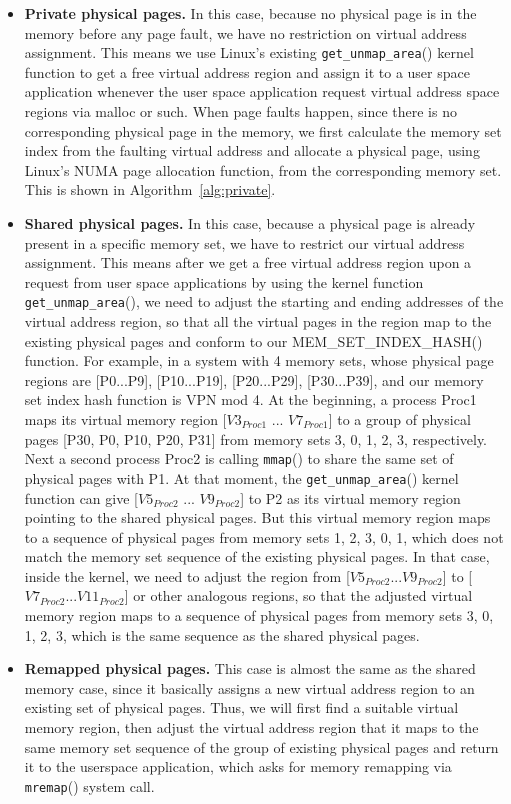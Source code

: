 \begin{itemize}
  \item \textbf{Private physical pages.} In this case, because no physical page is in the memory
  before any page fault, we have no restriction on virtual address assignment. 
  This means we use Linux’s existing \verb|get_unmap_area|() kernel function to 
  get a free virtual address region and assign it to a user space application whenever
  the user space application request virtual address space regions via malloc or such.
  When page faults happen, since there is no corresponding physical page in the memory, 
  we first calculate the memory set index from the faulting virtual address and allocate 
  a physical page, using Linux's NUMA page allocation function, from the corresponding 
  memory set. This is shown in Algorithm~\ref{alg:private}.
  
  \item \textbf{Shared physical pages.} In this case, because a physical page is already 
  present in a specific memory set, we have to restrict our virtual address assignment. 
  This means after we get a free virtual address region upon a request from user space applications
  by using the kernel function \verb|get_unmap_area|(), we need to adjust the starting
  and ending addresses of the virtual address region, so that all the virtual pages 
  in the region map to the existing physical pages and conform to our MEM\_SET\_INDEX\_HASH()
  function. For example, in a system with 4 memory sets, whose physical page regions are [P0...P9], 
  [P10...P19], [P20...P29], [P30...P39], and our memory set index hash function is VPN mod 4.
  At the beginning, a process Proc1 maps its virtual memory region [$V3_{Proc1}$ ... $V7_{Proc1}$] to a group of 
  physical pages [P30, P0, P10, P20, P31] from memory sets 3, 0, 1, 2, 3, respectively. 
  Next a second process Proc2 is calling \verb|mmap|() to 
  share the same set of physical pages with P1. At that moment, the \verb|get_unmap_area|() 
  kernel function can give [$V5_{Proc2}$ ... $V9_{Proc2}$] to P2 as its virtual memory region pointing to the
  shared physical pages. But this virtual memory region maps to a sequence of physical pages from memory
  sets 1, 2, 3, 0, 1, which does not match the memory set sequence of the existing physical pages.
  In that case, inside the kernel, we need to adjust the region 
  from [$V5_{Proc2}...V9_{Proc2}$] to [$V7_{Proc2}...V11_{Proc2}$] or other analogous regions, so that the adjusted
  virtual memory region maps to a sequence of physical pages from memory sets 3, 0, 1, 2, 3,
  which is the same sequence as the shared physical pages.

  \item \textbf{Remapped physical pages.} This case is almost the same as the shared memory case, 
  since it basically assigns a new virtual address region to an existing set of physical pages. 
  Thus, we will first find a suitable virtual memory region, then adjust the virtual address region
  that it maps to the same memory set sequence of the group of existing physical pages and return
  it to the userspace application, which asks for memory remapping via \verb|mremap|() system call.

\end{itemize}


